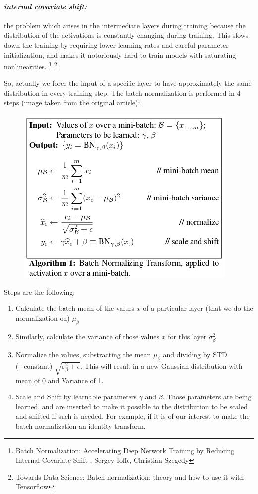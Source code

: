 \documentclass[a4paper]{iacas}
\begin{document}
\paragraph{\textit{internal covariate shift:}}
the problem which arises in the intermediate layers during training because the distribution of the activations is constantly changing during training. This slows down the training by requiring lower learning rates and careful parameter initialization, and makes it notoriously hard to train models with saturating nonlinearities. \footnote{Batch Normalization: Accelerating Deep Network Training by Reducing Internal Covariate Shift , Sergey Ioffe, Christian Szegedy} \footnote{Towards Data Science: Batch normalization: theory and how to use it with Tensorflow}
\newline

So, actually we force the input of a specific layer to have approximately the same distribution in every training step. The batch normalization is performed in 4 steps (image taken from the original article):



\vskip 0.1in
\begin{figure}
	\includegraphics[scale=0.6]{imgs/batch_norm.PNG}
\end{figure}
\vskip 0.1in

Steps are the following:
\begin{enumerate}
\item Calculate the batch mean of the values $x$ of a particular layer (that we do the normalization on) $\mu_{\beta}$
\item Similarly, calculate the variance of those values $x$ for this layer $\sigma_{\beta}^{2}$
\item Normalize the values, substracting the mean $\mu_{\beta}$ and dividing by STD (+constant) $\sqrt{\sigma_{\beta}^{2} + \epsilon}$. This will result in a new Gaussian distribution with mean of 0 and Variance of 1. 
\item Scale and Shift by learnable parameters $\gamma$ and $\beta$. Those parameters are being learned, and are inserted to make it possible to the distribution to be scaled and shifted if such is needed. For example, if it is of our interest to make the batch normalization an identity transform. 
\end{enumerate}
\end{document}
